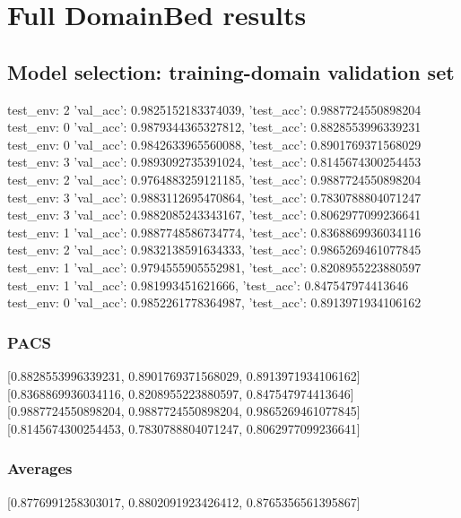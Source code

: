 \documentclass{article}
\begin{document}
\section{Full DomainBed results}

\subsection{Model selection: training-domain validation set}
test_env: 2
{'val_acc': 0.9825152183374039, 'test_acc': 0.9887724550898204}
test_env: 0
{'val_acc': 0.9879344365327812, 'test_acc': 0.8828553996339231}
test_env: 0
{'val_acc': 0.9842633965560088, 'test_acc': 0.8901769371568029}
test_env: 3
{'val_acc': 0.9893092735391024, 'test_acc': 0.8145674300254453}
test_env: 2
{'val_acc': 0.9764883259121185, 'test_acc': 0.9887724550898204}
test_env: 3
{'val_acc': 0.9883112695470864, 'test_acc': 0.7830788804071247}
test_env: 3
{'val_acc': 0.9882085243343167, 'test_acc': 0.8062977099236641}
test_env: 1
{'val_acc': 0.9887748586734774, 'test_acc': 0.8368869936034116}
test_env: 2
{'val_acc': 0.9832138591634333, 'test_acc': 0.9865269461077845}
test_env: 1
{'val_acc': 0.9794555905552981, 'test_acc': 0.8208955223880597}
test_env: 1
{'val_acc': 0.981993451621666, 'test_acc': 0.847547974413646}
test_env: 0
{'val_acc': 0.9852261778364987, 'test_acc': 0.8913971934106162}

\subsubsection{PACS}
[0.8828553996339231, 0.8901769371568029, 0.8913971934106162]
[0.8368869936034116, 0.8208955223880597, 0.847547974413646]
[0.9887724550898204, 0.9887724550898204, 0.9865269461077845]
[0.8145674300254453, 0.7830788804071247, 0.8062977099236641]

\begin{center}
\end{center}

\subsubsection{Averages}
[0.8776991258303017, 0.8802091923426412, 0.8765356561395867]

\begin{center}
\end{center}
\end{document}
